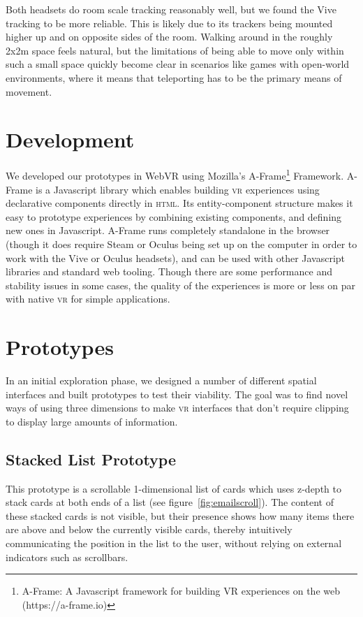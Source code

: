 \documentclass[nobib]{tufte-book} %
\begin{document}
Both headsets do room scale tracking reasonably well, but we found the Vive tracking to be more reliable. This is likely due to its trackers being mounted higher up and on opposite sides of the room. Walking around in the roughly 2x2m space feels natural, but the limitations of being able to move only within such a small space quickly become clear in scenarios like games with open-world environments, where it means that teleporting has to be the primary means of movement.

\section{Development}
We developed our prototypes in WebVR using Mozilla's A-Frame\footnote{A-Frame: A Javascript framework for building VR experiences on the web (https://a-frame.io)} Framework. A-Frame is a Javascript library which enables building \textsc{vr} experiences using declarative components directly in \textsc{html}. Its entity-component structure makes it easy to prototype experiences by combining existing components, and defining new ones in Javascript. A-Frame runs completely standalone in the browser (though it does require Steam or Oculus being set up on the computer in order to work with the Vive or Oculus headsets), and can be used with other Javascript libraries and standard web tooling. Though there are some performance and stability issues in some cases, the quality of the experiences is more or less on par with native \textsc{vr} for simple applications.

\section{Prototypes}
In an initial exploration phase, we designed a number of different spatial interfaces and built prototypes to test their viability. The goal was to find novel ways of using three dimensions to make \textsc{vr} interfaces that don't require clipping to display large amounts of information.

\subsection{Stacked List Prototype}
This prototype is a scrollable 1-dimensional list of cards which uses z-depth to stack cards at both ends of a list (see figure~\ref{fig:emailscroll}). The content of these stacked cards is not visible, but their presence shows how many items there are above and below the currently visible cards, thereby intuitively communicating the position in the list to the user, without relying on external indicators such as scrollbars.
\end{document}
